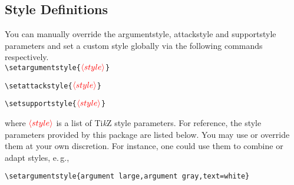 \documentclass[headings=normal]{scrartcl}
\newcommand{\tikzname}{Ti\emph{k}Z\xspace}
\newcommand{\opt}[2][red]{\ensuremath{\textcolor{#1}{\langle #2\rangle}}}
\begin{document}
\subsection{Style Definitions}\label{sec:style-definitions}
    You can manually override the \textsf{argumentstyle}, \textsf{attackstyle} and \textsf{supportstyle} parameters and set a custom style globally via the following commands respectively.\\

    \vspace{-0.3cm}
    \noindent
    \verb|\setargumentstyle{|\opt{style}\verb|}|
    
    \noindent
    \verb|\setattackstyle{|\opt{style}\verb|}|
    
    \noindent
    \verb|\setsupportstyle{|\opt{style}\verb|}|
    
    \begin{list}{}{\leftmargin=\parindent\rightmargin=0pt}
        \item
        where \opt{style} is a list of \tikzname style parameters.
        For reference, the style parameters provided by this package are listed below.
        You may use or override them at your own discretion.
        For instance, one could use them to combine or adapt styles, e.\,g.,

        \noindent
    \verb|\setargumentstyle{argument large,argument gray,text=white}|
    \end{list}
\end{document}
